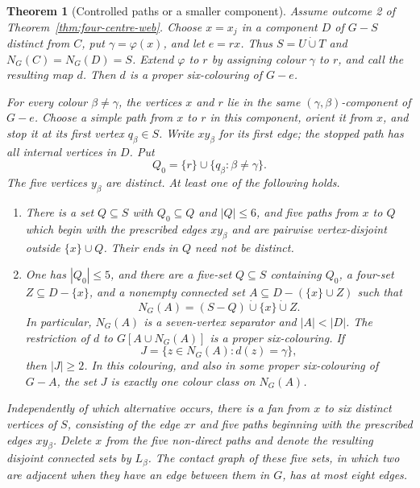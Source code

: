\documentclass[11pt]{amsart}
\newtheorem{theorem}{Theorem}[section]
\begin{document}
\begin{theorem}[Controlled paths or a smaller component]
\label{thm:web-edge-response}
Assume outcome 2 of Theorem~\ref{thm:four-centre-web}.  Choose $x=x_j$ in
a component $D$ of $G-S$ distinct from $C$, put
$\gamma=\varphi(x)$, and let $e=rx$.  Thus
$S=U\mathbin{\dot\cup}T$ and $N_G(C)=N_G(D)=S$.
Extend $\varphi$ to $r$ by assigning colour $\gamma$ to $r$, and call the
resulting map $d$.  Then $d$ is a proper six-colouring of $G-e$.

For every colour $\beta\ne\gamma$, the vertices $x$ and $r$ lie in the same
$(\gamma,\beta)$-component of $G-e$.  Choose a simple path from $x$ to $r$
in this component, orient it from $x$, and stop it at its first vertex
$q_\beta\in S$.  Write $xy_\beta$ for its first edge; the stopped path has
all internal vertices in $D$.  Put
\[
 Q_0=\{r\}\cup\{q_\beta:\beta\ne\gamma\}.
\]
The five vertices $y_\beta$ are distinct.  At least one of the following
holds.

\begin{enumerate}
\item There is a set $Q\subseteq S$ with $Q_0\subseteq Q$ and $|Q|\leq6$,
      and five paths from $x$ to $Q$ which begin with the prescribed edges
      $xy_\beta$ and are pairwise vertex-disjoint outside
      $\{x\}\cup Q$.  Their ends in $Q$ need not be distinct.
\item One has $|Q_0|\leq5$, and there are a five-set $Q\subseteq S$
      containing $Q_0$, a four-set $Z\subseteq D-\{x\}$, and a nonempty
      connected set $A\subseteq D-(\{x\}\cup Z)$ such that
      \[
        N_G(A)=(S-Q)\mathbin{\dot\cup}\{x\}
                         \mathbin{\dot\cup}Z.            \tag{6.6}
      \]
      In particular, $N_G(A)$ is a seven-vertex separator and
      $|A|<|D|$.  The restriction of $d$ to
      $G[A\cup N_G(A)]$ is a proper six-colouring.  If
      \[
          J=\{z\in N_G(A):d(z)=\gamma\},
      \]
      then $|J|\geq2$.  In this colouring, and also in some proper
      six-colouring of $G-A$, the set $J$ is exactly one colour class on
      $N_G(A)$.
\end{enumerate}

Independently of which alternative occurs, there is a fan from $x$ to six
distinct vertices of $S$, consisting of the edge $xr$ and five paths
beginning with the prescribed edges $xy_\beta$.  Delete $x$ from the five
non-direct paths and denote the resulting disjoint connected sets by
$L_\beta$.  The contact graph of these five sets, in which two are
adjacent when they have an edge between them in $G$, has at most eight
edges.
\end{theorem}
\end{document}

